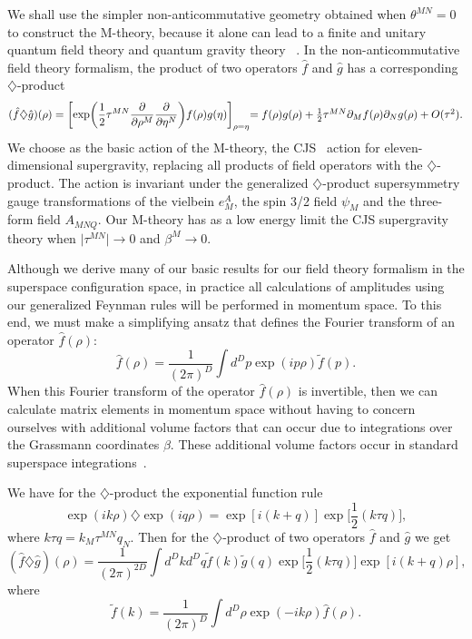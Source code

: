\documentclass[a4paper,12pt]{article}
\begin{document}
We shall use the simpler non-anticommutative
geometry obtained when $\theta^{MN}=0$ to construct the M-theory,
because it alone can lead to a finite and unitary quantum field theory and
quantum gravity theory ~\cite{Moffat2,Moffat3,Moffat4,Moffat5}.
In the non-anticommutative field theory formalism, the product of two
operators ${\hat f}$ and ${\hat g}$ has a corresponding
$\diamondsuit$-product
\begin{equation}
\label{diamondproduct}
({\hat f}\diamondsuit {\hat g})(\rho)
=\biggl[\exp\biggr(\frac{1}{2}\tau^{MN}\frac{\partial}{\partial\rho^M}\frac{\partial}
{\partial\eta^N}\biggr)f(\rho)g(\eta)\biggr]_{\rho=\eta} $$ $$
=f(\rho)g(\rho)+\frac{1}{2}\tau^{MN}\partial_M f(\rho)\partial_N
g(\rho)+O(\tau^2).
\end{equation}
We choose as the basic action of the
M-theory, the CJS~\cite{Julia} action for
eleven-dimensional supergravity, replacing all products of field operators
with the $\diamondsuit$-product. The action is invariant under
the generalized $\diamondsuit$-product supersymmetry gauge
transformations of the vielbein $e^A_M$, the spin 3/2 field
$\psi_M$ and the three-form field $A_{MNQ}$. Our M-theory has as
a low energy limit the CJS supergravity theory when
$\vert\tau^{MN}\vert\rightarrow 0$ and $\beta^M\rightarrow 0$.

Although we derive many of our basic results for our field theory
formalism in the superspace configuration space, in practice all
calculations of amplitudes using our generalized Feynman rules
will be performed in momentum space. To this end, we must make a
simplifying ansatz that defines the Fourier transform of an
operator ${\hat f}(\rho)$:
\begin{equation}
{\hat f}(\rho)=\frac{1}{(2\pi)^D}\int d^Dp
\exp(ip\rho){\tilde f}(p).
\end{equation}
When this Fourier transform of the operator ${\hat f}(\rho)$ is
invertible, then we can calculate matrix elements in momentum
space without having to concern ourselves with additional volume
factors that can occur due to integrations over the Grassmann
coordinates $\beta$. These additional volume factors occur in
standard superspace integrations~\cite{Buchbinder}.

We have for the $\diamondsuit$-product the exponential
function rule
\begin{equation}
\exp(ik\rho)\diamondsuit\exp(iq\rho)=\exp[i(k+q)]\exp\biggl[\frac{1}{2}(k\tau
q)\biggr],
\end{equation}
where $k\tau q=k_M\tau^{MN}q_N$.
Then for the $\diamondsuit$-product
of two operators ${\hat f}$ and ${\hat g}$ we get
\begin{equation}
({\hat f}\diamondsuit{\hat g})(\rho)=\frac{1}{(2\pi)^{2D}}\int
d^Dkd^Dq{\tilde f}(k){\tilde g}(q)\exp\biggl[\frac{1}{2}(k\tau
q)\biggr]\exp[i(k+q)\rho],
\end{equation}
where
\begin{equation}
{\tilde f}(k)=\frac{1}{(2\pi)^D}\int
d^D\rho\exp(-ik\rho){\hat f}(\rho).
\end{equation}
\end{document}
